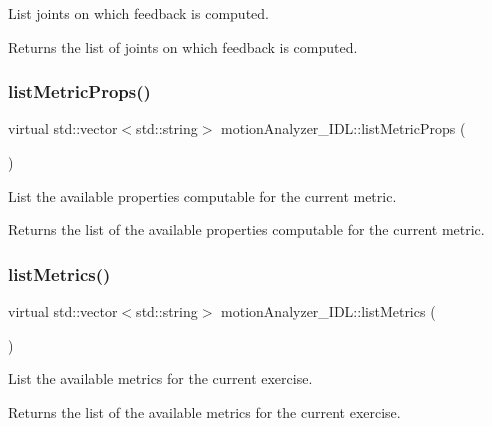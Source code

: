 List joints on which feedback is computed. 

\begin{DoxyReturn}{Returns}
the list of joints on which feedback is computed. 
\end{DoxyReturn}
\mbox{\label{classmotionAnalyzer__IDL_a05b2616e56207a2acc4dbc4429f56609}} 
\subsubsection{\texorpdfstring{list\+Metric\+Props()}{listMetricProps()}}
{\footnotesize\ttfamily virtual std\+::vector$<$std\+::string$>$ motion\+Analyzer\+\_\+\+I\+D\+L\+::list\+Metric\+Props (\begin{DoxyParamCaption}{ }\end{DoxyParamCaption})\hspace{0.3cm}{\ttfamily [virtual]}}



List the available properties computable for the current metric. 

\begin{DoxyReturn}{Returns}
the list of the available properties computable for the current metric. 
\end{DoxyReturn}
\mbox{\label{classmotionAnalyzer__IDL_a139730029d1e7112eb66636c21fe99c8}} 
\subsubsection{\texorpdfstring{list\+Metrics()}{listMetrics()}}
{\footnotesize\ttfamily virtual std\+::vector$<$std\+::string$>$ motion\+Analyzer\+\_\+\+I\+D\+L\+::list\+Metrics (\begin{DoxyParamCaption}{ }\end{DoxyParamCaption})\hspace{0.3cm}{\ttfamily [virtual]}}



List the available metrics for the current exercise. 

\begin{DoxyReturn}{Returns}
the list of the available metrics for the current exercise. 
\end{DoxyReturn}
\mbox{\label{classmotionAnalyzer__IDL_a656d8a9edd690c651cb1079cfa697c10}} 
